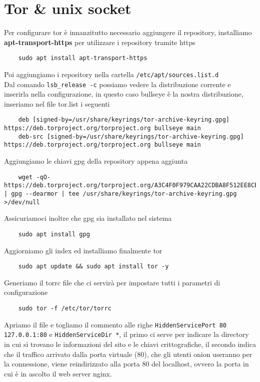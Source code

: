 \section{Tor \& unix socket}
Per configurare tor è innanzitutto necessario aggiungere il repository, installiamo \textbf{apt-transport-https} per utilizzare i repository tramite https
\begin{lstlisting}
    sudo apt install apt-transport-https
\end{lstlisting}
Poi aggiungiamo i repository nella cartella \lstinline{/etc/apt/sources.list.d} \\
Dal comando \lstinline{lsb_release -c} possiamo vedere la distribuzione corrente e inserirla nella configurazione, in questo caso bullseye è la nostra distribuzione, inseriamo nel file tor.list i seguenti 
\begin{lstlisting}
    deb [signed-by=/usr/share/keyrings/tor-archive-keyring.gpg] https://deb.torproject.org/torproject.org bullseye main
    deb-src [signed-by=/usr/share/keyrings/tor-archive-keyring.gpg] https://deb.torproject.org/torproject.org bullseye main
\end{lstlisting}
Aggiungiamo le chiavi gpg della repository appena aggiunta
\begin{lstlisting}
    wget -qO- https://deb.torproject.org/torproject.org/A3C4F0F979CAA22CDBA8F512EE8CBC9E886DDD89.asc | gpg --dearmor | tee /usr/share/keyrings/tor-archive-keyring.gpg >/dev/null
\end{lstlisting}
Assicuriamoci inoltre che gpg sia installato nel sistema
\begin{lstlisting}
    sudo apt install gpg
\end{lstlisting}
Aggiorniamo gli index ed installiamo finalmente tor
\begin{lstlisting}
    sudo apt update && sudo apt install tor -y 
\end{lstlisting} \cite{TorRepo}
Generiamo il torrc file che ci servirà per impostare tutti i parametri di configurazione 
\begin{lstlisting}
    sudo tor -f /etc/tor/torrc
\end{lstlisting}
Apriamo il file e togliamo il commento alle righe \lstinline{HiddenServicePort 80 127.0.0.1:80} e \lstinline{HiddenServiceDir *}, il primo ci serve per indicare la directory in cui si trovano le informazioni del sito e le chiavi crittografiche, il secondo indica che il traffico arrivato dalla porta virtuale (80), che gli utenti onion useranno per la connessione, viene reindirizzato alla porta 80 del localhost, ovvero la porta in cui è in ascolto il web server nginx. \\
